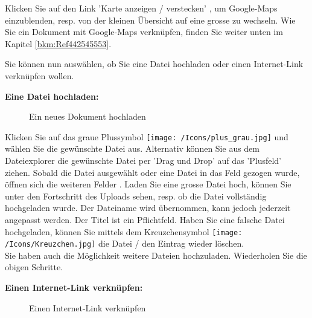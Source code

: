 Klicken Sie auf den Link 'Karte anzeigen / verstecken' , um Google-Maps einzublenden, resp. von der kleinen Übersicht auf eine grosse zu wechseln. Wie Sie ein Dokument mit Google-Maps verknüpfen, finden Sie weiter unten im Kapitel \ref{bkm:Ref442545553}. \newline

Sie können nun auswählen, ob Sie eine Datei hochladen  oder einen Internet-Link verknüpfen  wollen.

\vspace{\baselineskip}

\textbf{Eine Datei hochladen:} 
\begin{figure}[H]
\caption{Ein neues Dokument hochladen}
\end{figure}

Klicken Sie auf das graue Plussymbol \texttt{[image: /Icons/plus\_grau.jpg]}  und wählen Sie die gewünschte Datei aus. Alternativ können Sie aus dem Dateiexplorer die gewünschte Datei per 'Drag und Drop' auf das 'Plusfeld' ziehen. Sobald die Datei ausgewählt oder eine Datei in das Feld gezogen wurde, öffnen sich die weiteren Felder . Laden Sie eine grosse Datei hoch, können Sie unter  den Fortschritt des Uploads sehen, resp. ob die Datei vollständig hochgeladen wurde. Der Dateiname  wird übernommen, kann jedoch jederzeit angepasst werden. Der Titel ist ein Pflichtfeld. Haben Sie eine falsche Datei hochgeladen, können Sie mittels dem Kreuzchensymbol \texttt{[image: /Icons/Kreuzchen.jpg]}  die Datei / den Eintrag wieder löschen. \\
Sie haben auch die Möglichkeit weitere Dateien hochzuladen. Wiederholen Sie die obigen Schritte.

\vspace{\baselineskip}

\textbf{Einen Internet-Link verknüpfen:} 
\begin{figure}[H]
\caption{Einen Internet-Link verknüpfen}
\end{figure}

